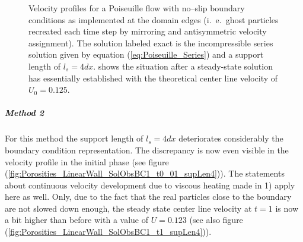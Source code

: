\documentclass[11pt,a4paper,twoside]{report}
\begin{document}
\begin{figure}[!htbp]
\caption[Velocity profiles Poiseuille flow]{Velocity profiles for a Poiseuille flow with no--slip boundary conditions as implemented at the domain edges (i.\ e.\ ghost particles recreated each time step by mirroring and antisymmetric velocity assignment). The solution labeled exact is the incompressible series solution given by equation (\ref{eq:Poiseuille_Series}) and a support length of $l_s=4dx$.   shows the situation after a steady-state solution has essentially established with the theoretical center line velocity of $U_0=0.125$.}

\end{figure} 

\subparagraph{Method 2}
For this method the support length of $l_s=4dx$ deteriorates considerably the boundary condition representation. The discrepancy is now even visible in the velocity profile in the initial phase (see figure (\ref{fig:Porosities_LinearWall_SolObsBC1_t0_01_supLen4})).
The statements  about continuous velocity development due to viscous heating made in 1) apply here as well. Only, due to the fact that the real particles close to the boundary are not slowed down enough, the steady state center line velocity at $t=1$ is now a bit higher than before with a value of $U=0.123$ (see also figure (\ref{fig:Porosities_LinearWall_SolObsBC1_t1_supLen4})). 
 
\end{document}
